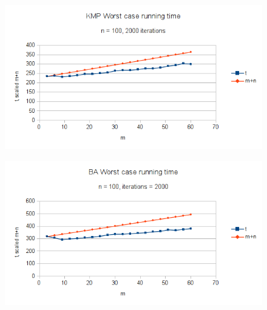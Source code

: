 \documentclass[a4paper,10pt]{article}
\begin{document}
\begin{figure}[h]
  \centering
  \includegraphics[scale=0.75]{./images/eval_kmp.png}
  \label{fig:eval1}
\end{figure}

\begin{figure}[h]
  \centering
  \includegraphics[scale=0.75]{./images/eval_ba - 1.png}
  \label{fig:eval2}
\end{figure}
\end{document}
